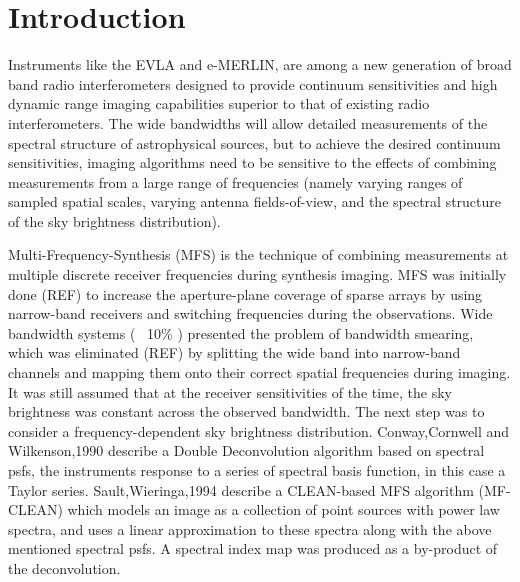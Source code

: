 \documentclass[structabstract]{aa}
\begin{document}
   \maketitle
%
\section{Introduction}

Instruments like the EVLA and e-MERLIN, are among a new 
generation of broad band radio interferometers designed to provide continuum sensitivities and
high dynamic range imaging capabilities superior to that of existing radio interferometers.
The wide bandwidths will allow detailed measurements of the spectral structure of astrophysical
sources, but to achieve the desired continuum sensitivities, imaging algorithms need to be 
sensitive to the effects of combining measurements from a large range of frequencies 
(namely varying ranges of sampled spatial scales, varying antenna fields-of-view, and
 the spectral structure of the sky brightness distribution).


Multi-Frequency-Synthesis (MFS) is the technique of combining measurements at multiple
discrete receiver frequencies during synthesis imaging.
MFS was initially done (REF) to increase the aperture-plane coverage
of sparse arrays by using narrow-band receivers and switching frequencies during the observations.
Wide bandwidth systems ( ~10\% ) presented the problem of bandwidth smearing, which was
eliminated (REF) by splitting the wide band into narrow-band channels and mapping them onto
their correct spatial frequencies during imaging. It was still assumed that
at the receiver sensitivities of the time, 
the sky brightness was constant across the observed bandwidth.
The next step was to consider a frequency-dependent sky brightness distribution.
Conway,Cornwell and Wilkenson,1990 describe a Double Deconvolution algorithm based on
spectral psfs, the instruments response to a series of spectral basis function,
in this case a Taylor series.
Sault,Wieringa,1994 describe a CLEAN-based MFS algorithm (MF-CLEAN) which models an image 
as a collection of point sources with power law spectra, and uses a linear approximation
to these spectra along with the above mentioned spectral psfs. A spectral index map
was produced as a by-product of the deconvolution.
\end{document}
